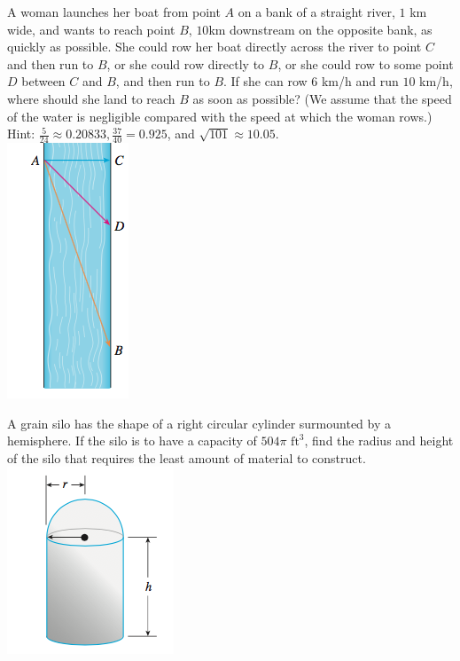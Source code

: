 \documentclass[12pt, a4paper]{article}
\begin{document}
\begin{ex}
  A woman launches her boat from point \(A\) on a bank of a straight
  river, \(1\) km wide, and wants to reach point \(B\), \(10\)km
  downstream on the opposite bank, as quickly as possible. She could
  row her boat directly across the river to point \(C\) and then run
  to \(B\), or she could row directly to \(B\), or she could row to
  some point \(D\) between \(C\) and \(B\), and then run to \(B\). If
  she can row \(6\) km/h and run \(10\) km/h, where should she land to
  reach \(B\) as soon as possible? (We assume that the speed of the
  water is negligible compared with the speed at which the woman
  rows.) Hint: \(\frac{5}{24} \approx 0.20833, \frac{37}{40} =
  0.925\), and \(\sqrt{101} \approx 10.05\). \\
\includegraphics[scale=0.5]{images/river}
\end{ex}
\vspace{-1.5in}
\begin{ex}
  A grain silo has the shape of a right circular cylinder surmounted
  by a hemisphere. If the silo is to have a capacity of \(504 \pi
  \text{ ft}^3\), find the radius and height of the silo that requires
  the least amount of material to construct.\\
  \includegraphics[scale=0.6]{images/silo}
\end{ex}
\end{document}
